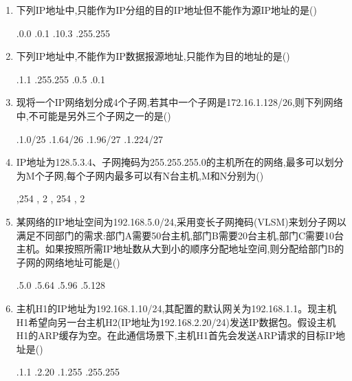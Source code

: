 \documentclass[12pt, a4paper, oneside, UTF8]{ctexbook}
\begin{document}
\begin{enumerate}
    \item 下列IP地址中,只能作为IP分组的目的IP地址但不能作为源IP地址的是(\qquad)
    \begin{choices}[2]
    .0.0
    .0.1
    .10.3
    .255.255
    \end{choices}

    \item 下列IP地址中,不能作为IP数据报源地址,只能作为目的地址的是(\qquad)
    \begin{choices}[2]
    .1.1
    .255.255
    .0.5
    .0.1
    \end{choices}

    \item 现将一个IP网络划分成4个子网,若其中一个子网是172.16.1.128/26,则下列网络中,不可能是另外三个子网之一的是(\qquad)
    \begin{choices}[2]
    .1.0/25
    .1.64/26
    .1.96/27
    .1.224/27
    \end{choices}

    \item IP地址为128.5.3.4、子网掩码为255.255.255.0的主机所在的网络,最多可以划分为M个子网,每个子网内最多可以有N台主机,M和N分别为(\qquad)
    \begin{choices}
    ,254
    , 2
    , 254
    , 2
    \end{choices}

    \item 某网络的IP地址空间为192.168.5.0/24,采用变长子网掩码(VLSM)来划分子网以满足不同部门的需求:部门A需要50台主机,部门B需要20台主机,部门C需要10台主机。如果按照所需IP地址数从大到小的顺序分配地址空间,则分配给部门B的子网的网络地址可能是(\qquad)
    \begin{choices}[2]
    .5.0
    .5.64
    .5.96
    .5.128
    \end{choices}

    \item 主机H1的IP地址为192.168.1.10/24,其配置的默认网关为192.168.1.1。现主机H1希望向另一台主机H2(IP地址为192.168.2.20/24)发送IP数据包。假设主机H1的ARP缓存为空。在此通信场景下,主机H1首先会发送ARP请求的目标IP地址是(\qquad)
    \begin{choices}[2]
    .1.1
    .2.20
    .1.255
    .255.255
    \end{choices}


\end{enumerate}
\end{document}
